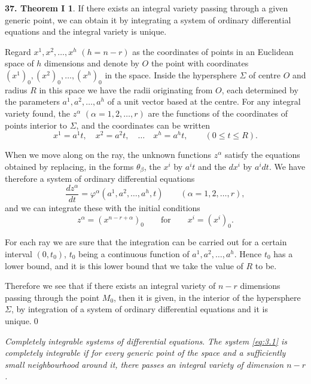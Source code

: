 \documentclass[leqno,11pt]{book}
\numberwithin{equation}{chapter}
\theoremstyle{shape1}
\theoremstyle{shape0}
\theoremstyle{shape2}
\theoremstyle{definition}
\begin{document}
\vspace{12pt}\addtocounter{frenchsec}{1}
\theoremstyle{shape1}
\newtheorem*{thm37}{\hspace{15pt}\textbf{37.} Theorem I}
\begin{thm37}
  If there exists an integral variety passing through a given generic point, we can obtain it by integrating a system of ordinary differential equations and the integral variety is unique.
\end{thm37}

Regard $x^{1},x^{2},\dots,x^{h}$ $(h=n-r)$ as the coordinates of points in an Euclidean space of $h$ dimensions and denote by $O$ the point with coordinates $(x^{1})_{0},(x^{2})_{0},\dots,(x^{h})_{0}$ in the space. Inside the hypersphere $\Sigma$ of centre $O$ and radius $R$ in this space we have the radii originating from $O$, each determined by the parameters $a^{1},a^{2},\dots,a^{h}$ of a unit vector based at the centre. For any integral variety found, the $z^{\alpha}$ $(\alpha=1,2,\dots,r)$ are the functions of the coordinates of points interior to $\Sigma$, and the coordinates can be written
\[
x^{1}=a^{1}t,\quad x^{2}=a^{2}t,\quad\dots\quad x^{h}=a^{h}t,\qquad(0\le t\le R).
\] 

When we move along on the ray, the unknown functions $z^{\alpha}$ satisfy the equations obtained by replacing, in the forms $\theta_{\beta}$, the $x^{i}$ by $a^{i}t$ and the $dx^{i}$ by $a^{i}dt$. We have therefore a system of ordinary differential equations
\begin{equation}
  \label{eq:3.2}
  \frac{d z^{\alpha}}{dt}=\varphi^{\alpha}(a^{1},a^{2},\dots,a^{h},t)\qquad(\alpha=1,2,\dots,r),
\end{equation}
and we can integrate these with the initial conditions
\[
z^{\alpha}=(x^{n-r+\alpha})_{0}\qquad\text{for}\qquad x^{i}=(x^{i})_{0}.
\]

For each ray we are sure that the integration can be carried out for a certain interval $(0,t_{0})$, $t_{0}$ being a continuous function of $a^{1},a^{2},\dots,a^{h}$. Hence $t_{0}$ has a lower bound, and it is this lower bound that we take the value of $R$ to be.

Therefore we see that if there exists an integral variety of $n-r$ dimensions passing through the point $M_{0}$, then it is given, in the interior of the hypersphere $\Sigma$, by integration of a system of ordinary differential equations and it is unique.\qed

\vspace{12pt}\fsec \emph{Completely integrable systems of differential equations}. \emph{The system \eqref{eq:3.1} is completely integrable if for every generic point of the space and a sufficiently small neighbourhood around it, there passes an integral variety of dimension $n-r$.}
\end{document}
